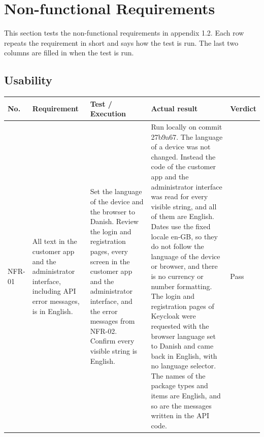 \documentclass[a4paper,11pt]{article}
\begin{document}
\section{Non-functional Requirements}
This section tests the non-functional requirements in appendix 1.2. Each row repeats the requirement in short and says how the test is run. The last two columns are filled in when the test is run.

\subsection{Usability}
\begin{center}
\footnotesize
\begin{tabular}{@{}p{1.2cm}p{3.8cm}p{5.8cm}p{1.7cm}p{1.3cm}@{}}
\hline
\textbf{No.} & \textbf{Requirement} & \textbf{Test / Execution} & \textbf{Actual result} & \textbf{Verdict} \\
\hline
NFR-01 & All text in the customer app and the administrator interface, including API error messages, is in English. & Set the language of the device and the browser to Danish. Review the login and registration pages, every screen in the customer app and the administrator interface, and the error messages from NFR-02. Confirm every visible string is English. & Run locally on commit 27b9a67. The language of a device was not changed. Instead the code of the customer app and the administrator interface was read for every visible string, and all of them are English. Dates use the fixed locale en-GB, so they do not follow the language of the device or browser, and there is no currency or number formatting. The login and registration pages of Keycloak were requested with the browser language set to Danish and came back in English, with no language selector. The names of the package types and items are English, and so are the messages written in the API code. & Pass \\
\hline

\end{tabular}
\end{center}
\end{document}
